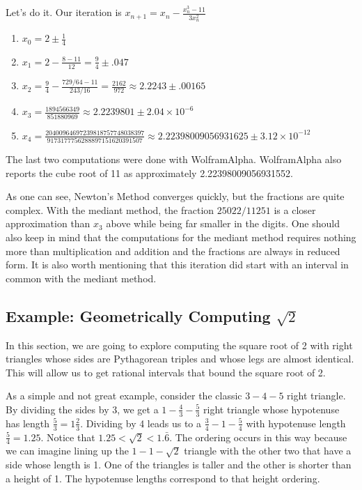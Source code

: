 \documentclass[12pt]{article}
\theoremstyle{remark}
\begin{document}
Let's do it. Our iteration is $x_{n+1} = x_n - \frac{x_n^3 -11}{3 x_n^2}$ 
\begin{enumerate}
\item $x_0 = 2 \pm \frac{1}{4}$
\item $x_1 = 2 - \frac{8- 11}{12} = \frac{9}{4} \pm .047$
\item $x_2 = \frac{9}{4} - \frac{ 729/64 - 11 }{243/16} = \frac{2162}{972}\approx 2.2243 \pm .00165$
\item $x_3 = \frac{1894566349}{851880969} \approx 2.2239801 \pm 2.04\times 10^{-6}$
\item $x_4 = \frac{20400964697239818757748038397}{9173177756288897151620391507} \approx 2.22398009056931625 \pm 3.12 \times 10^{-12}$
\end{enumerate}


The last two computations were done with WolframAlpha.  WolframAlpha also reports the cube root of 11 as approximately 2.22398009056931552. 

As one can see, Newton's Method converges quickly, but the fractions are quite complex. With the mediant method, the fraction $25022/11251$ is a closer approximation than $x_3$ above while being far smaller in the digits. One should also keep in mind that the computations for the mediant method requires nothing more than multiplication and addition and the fractions are always in reduced form. It is also worth mentioning that this iteration did start with an interval in common with the mediant method. 

\subsection{Example: Geometrically Computing $\sqrt{2}$}

In this section, we are going to explore computing the square root of 2 with right triangles whose sides are Pythagorean triples and whose legs are almost identical. This will allow us to get rational intervals that bound the square root of 2. 

As a simple and not great example, consider the classic $3-4-5$ right triangle. By dividing the sides by 3, we get a $1-\frac{4}{3}-\frac{5}{3}$ right triangle whose hypotenuse has length $\frac{5}{3} = 1 \frac{2}{3}$. Dividing by 4 leads us to a $\frac{3}{4}-1-\frac{5}{4}$ with hypotenuse  length $\frac{5}{4} = 1.25$. Notice that $1.25 < \sqrt{2} < 1.\bar{6}$.  The ordering occurs in this way because we can imagine lining up the $1-1-\sqrt{2}$ triangle with the other two that have a side whose length is 1. One of the triangles is taller and the other is shorter than a height of 1. The hypotenuse lengths correspond to that height ordering. 
\end{document}
